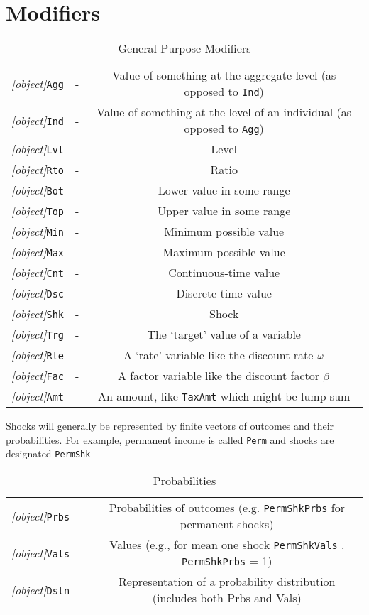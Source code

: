 \documentclass[12pt]{econtex}
\begin{document}
\section{Modifiers}
\begin{table}[h]
	\centering
	\begin{tabular}{|>{\ttfamily}ccc|} 		
		\hline
   \textit{[object]}\texttt{Agg} & - & Value of something at the aggregate level (as opposed to \texttt{Ind})
\\ \textit{[object]}\texttt{Ind} & - & Value of something at the level of an individual (as opposed to \texttt{Agg})
\\ \textit{[object]}\texttt{Lvl} & - & Level 
\\ \textit{[object]}\texttt{Rto} & - & Ratio 
\\ \textit{[object]}\texttt{Bot} & - & Lower value in some range 
\\ \textit{[object]}\texttt{Top} & - & Upper value in some range 
\\ \textit{[object]}\texttt{Min} & - & Minimum possible value 
\\ \textit{[object]}\texttt{Max} & - & Maximum possible value 
\\ \textit{[object]}\texttt{Cnt} & - & Continuous-time value
\\ \textit{[object]}\texttt{Dsc} & - & Discrete-time value
\\ \textit{[object]}\texttt{Shk} & - & Shock 
\\ \textit{[object]}\texttt{Trg} & - & The `target' value of a variable 
\\ \textit{[object]}\texttt{Rte} & - & A `rate' variable like the discount rate $\omega$
\\ \textit{[object]}\texttt{Fac} & - & A factor variable like the discount factor $\beta$
\\ \textit{[object]}\texttt{Amt} & - & An amount, like \texttt{TaxAmt} which might be lump-sum
\\ 	\hline
	\end{tabular}
	\caption{General Purpose Modifiers}
	\label{table:General}
\end{table}	


Shocks will generally be represented by finite vectors of outcomes and their probabilities.  For example, permanent income is called \texttt{Perm} and shocks are designated \texttt{PermShk}
\begin{table}[ht]
	\centering
	\begin{tabular}{|>{\ttfamily}ccc|} 		
		\hline
   \textit{[object]}\texttt{Prbs} & - & Probabilities of outcomes (e.g. \texttt{PermShkPrbs} for permanent shocks) 
\\ \textit{[object]}\texttt{Vals} & - & Values (e.g., for mean one shock \texttt{PermShkVals} . \texttt{PermShkPrbs} = 1) 
\\ \textit{[object]}\texttt{Dstn} & - & Representation of a probability distribution (includes both Prbs and Vals)
\\ 	\hline
	\end{tabular}
	\caption{Probabilities}
	\label{table:Probabilities}
\end{table}	
\end{document}
